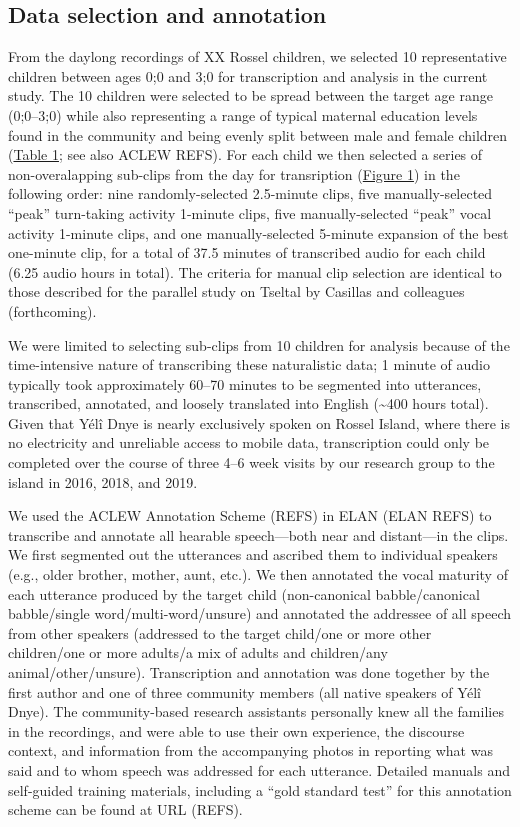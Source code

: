 \documentclass[,man,floatsintext]{apa6}
\begin{document}
\subsection{Data selection and annotation}\label{methods-samples}

From the daylong recordings of XX Rossel children, we selected 10
representative children between ages 0;0 and 3;0 for transcription and
analysis in the current study. The 10 children were selected to be
spread between the target age range (0;0--3;0) while also representing a
range of typical maternal education levels found in the community and
being evenly split between male and female children
(\protect\hyperlink{tab1}{Table 1}; see also ACLEW REFS). For each child
we then selected a series of non-overalapping sub-clips from the day for
transription (\protect\hyperlink{fig1}{Figure 1}) in the following
order: nine randomly-selected 2.5-minute clips, five manually-selected
\enquote{peak} turn-taking activity 1-minute clips, five
manually-selected \enquote{peak} vocal activity 1-minute clips, and one
manually-selected 5-minute expansion of the best one-minute clip, for a
total of 37.5 minutes of transcribed audio for each child (6.25 audio
hours in total). The criteria for manual clip selection are identical to
those described for the parallel study on Tseltal by Casillas and
colleagues (forthcoming).

We were limited to selecting sub-clips from 10 children for analysis
because of the time-intensive nature of transcribing these naturalistic
data; 1 minute of audio typically took approximately 60--70 minutes to
be segmented into utterances, transcribed, annotated, and loosely
translated into English (\textasciitilde{}400 hours total). Given that
Yélî Dnye is nearly exclusively spoken on Rossel Island, where there is
no electricity and unreliable access to mobile data, transcription could
only be completed over the course of three 4--6 week visits by our
research group to the island in 2016, 2018, and 2019.

We used the ACLEW Annotation Scheme (REFS) in ELAN (ELAN REFS) to
transcribe and annotate all hearable speech---both near and distant---in
the clips. We first segmented out the utterances and ascribed them to
individual speakers (e.g., older brother, mother, aunt, etc.). We then
annotated the vocal maturity of each utterance produced by the target
child (non-canonical babble/canonical babble/single
word/multi-word/unsure) and annotated the addressee of all speech from
other speakers (addressed to the target child/one or more other
children/one or more adults/a mix of adults and children/any
animal/other/unsure). Transcription and annotation was done together by
the first author and one of three community members (all native speakers
of Yélî Dnye). The community-based research assistants personally knew
all the families in the recordings, and were able to use their own
experience, the discourse context, and information from the accompanying
photos in reporting what was said and to whom speech was addressed for
each utterance. Detailed manuals and self-guided training materials,
including a \enquote{gold standard test} for this annotation scheme can
be found at URL (REFS).
\end{document}
